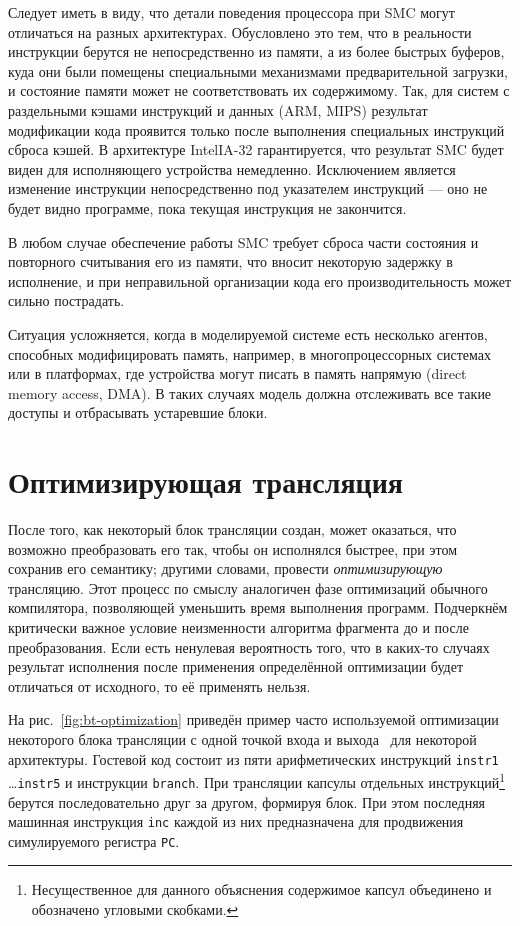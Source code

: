 Следует иметь в виду, что детали поведения процессора при SMC могут отличаться на разных архитектурах. Обусловлено это тем, что в реальности инструкции берутся не непосредственно из памяти, а из более быстрых буферов, куда они были помещены специальными механизмами предварительной загрузки, и состояние памяти может не соответствовать их содержимому. Так, для систем с раздельными кэшами инструкций и данных (ARM, MIPS) результат модификации кода проявится только после выполнения  специальных инструкций сброса кэшей. В архитектуре Intel\textregistered IA-32 гарантируется, что результат SMC будет виден для исполняющего устройства немедленно. Исключением является изменение инструкции непосредственно под указателем инструкций --- оно не будет видно программе, пока текущая инструкция не закончится. 

В любом случае обеспечение работы SMC требует сброса части состояния и повторного считывания его из памяти, что вносит некоторую задержку в исполнение, и при неправильной организации кода его производительность может сильно пострадать.  

Ситуация усложняется, когда в моделируемой системе есть несколько агентов, способных модифицировать память, например, в многопроцессорных системах или в платформах, где устройства могут писать в память напрямую (\abbr direct memory access, DMA). В таких случаях модель должна отслеживать все такие доступы и отбрасывать устаревшие блоки.

\section{Оптимизирующая трансляция}\label{sec:optimisations}

После того, как некоторый блок трансляции создан, может оказаться, что возможно преобразовать его так, чтобы он исполнялся быстрее, при этом сохранив его семантику; другими словами, провести \emph{оптимизирующую} трансляцию. Этот процесс по смыслу аналогичен фазе оптимизаций обычного компилятора, позволяющей уменьшить время выполнения программ. Подчеркнём критически важное условие неизменности алгоритма фрагмента до и после преобразования. Если есть ненулевая вероятность того, что в каких-то случаях результат исполнения после применения определённой оптимизации будет отличаться от исходного, то её применять нельзя.

На рис.~\ref{fig:bt-optimization} приведён пример часто используемой оптимизации некоторого блока трансляции с одной точкой входа и выхода~\cite{helmstetter2011} для некоторой архитектуры. Гостевой код состоит из пяти арифметических инструкций \texttt{instr1} \dots \texttt{instr5} и инструкции \texttt{branch}. При трансляции капсулы отдельных инструкций\footnote{Несущественное для данного объяснения содержимое капсул объединено и обозначено угловыми скобками.} берутся последовательно друг за другом, формируя блок. При этом последняя машинная инструкция \texttt{inc} каждой из них предназначена для продвижения симулируемого регистра \texttt{PC}. 

